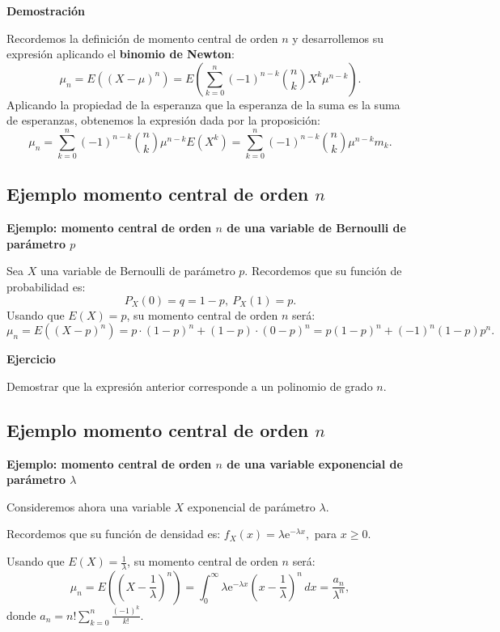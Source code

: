 \documentclass[]{book}
\begin{document}
\textbf{Demostración}

Recordemos la definición de momento central de orden \(n\) y desarrollemos su expresión aplicando el \textbf{binomio de Newton}:
\[
\mu_n = E\left((X-\mu)^n\right) =E\left(\sum_{k=0}^n (-1)^{n-k} \binom{n}{k} X^k\mu^{n-k}\right).
\]
Aplicando la propiedad de la esperanza que la esperanza de la suma es la suma de esperanzas, obtenemos la expresión dada por la proposición:
\[
\mu_n =\sum_{k=0}^n (-1)^{n-k} \binom{n}{k} \mu^{n-k} E\left(X^k\right) = \sum_{k=0}^n (-1)^{n-k} \binom{n}{k} \mu^{n-k} m_k.
\]

\hypertarget{ejemplo-momento-central-de-orden-n}{%
\subsection{\texorpdfstring{Ejemplo momento central de orden \(n\)}{Ejemplo momento central de orden n}}\label{ejemplo-momento-central-de-orden-n}}

\textbf{Ejemplo: momento central de orden \(n\) de una variable de Bernoulli de parámetro \(p\)}

Sea \(X\) una variable de Bernoulli de parámetro \(p\). Recordemos que su función de probabilidad es:
\[
P_X(0)=q=1-p,\ P_X(1)=p.
\]
Usando que \(E(X)=p\), su momento central de orden \(n\) será:
\[
\mu_n = E\left((X-p)^n\right)=p\cdot (1-p)^n+(1-p)\cdot (0-p)^n = p(1-p)^n + (-1)^n (1-p) p^n.
\]

\textbf{Ejercicio}

Demostrar que la expresión anterior corresponde a un polinomio de grado \(n\).

\hypertarget{ejemplo-momento-central-de-orden-n-1}{%
\subsection{\texorpdfstring{Ejemplo momento central de orden \(n\)}{Ejemplo momento central de orden n}}\label{ejemplo-momento-central-de-orden-n-1}}

\textbf{Ejemplo: momento central de orden \(n\) de una variable exponencial de parámetro \(\lambda\)}

Consideremos ahora una variable \(X\) exponencial de parámetro \(\lambda\).

Recordemos que su función de densidad es: \(f_X(x)=\lambda \mathrm{e}^{-\lambda x},\) para \(x\geq 0\).

Usando que \(E(X)=\frac{1}{\lambda}\), su momento central de orden \(n\) será:
\[
\mu_n = E\left(\left(X-\frac{1}{\lambda}\right)^n\right)=\int_0^\infty \lambda \mathrm{e}^{-\lambda x} \left(x-\frac{1}{\lambda}\right)^n\, dx =\frac{a_n}{\lambda^n},
\]
donde \(a_n = n!\sum\limits_{k=0}^n \frac{(-1)^k}{k!}.\)
\end{document}

